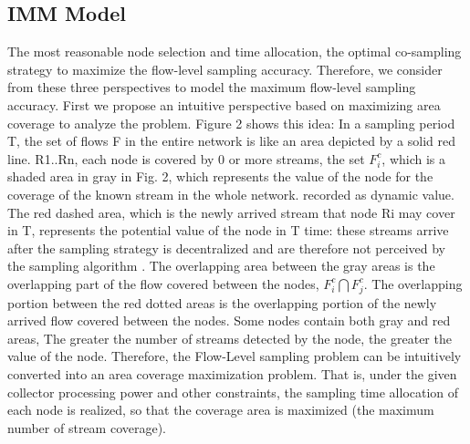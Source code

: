 \documentclass[conference,compsoc]{IEEEtran}
\begin{document}
\subsection{IMM  Model}





The most reasonable node selection and time allocation, the optimal co-sampling strategy to maximize the flow-level sampling accuracy. Therefore, we consider from these three perspectives to model the maximum flow-level sampling accuracy. First we propose an intuitive perspective based on maximizing area coverage to analyze the problem. Figure 2 shows this idea: In a sampling period T, the set of flows F in the entire network is like an area depicted by a solid red line. R1..Rn, each node is covered by 0 or more streams, the set $F_i^c$, which is a shaded area in gray in Fig. 2, which represents the value of the node for the coverage of the known stream in the whole network. recorded as dynamic value. The red dashed area, which is the newly arrived stream that node Ri may cover in T, represents the potential value of the node in T time: these streams arrive after the sampling strategy is decentralized and are therefore not perceived by the sampling algorithm . The overlapping area between the gray areas is the overlapping part of the flow covered between the nodes, $F_i^c \bigcap F_j^c$. The overlapping portion between the red dotted areas is the overlapping portion of the newly arrived flow covered between the nodes. Some nodes contain both gray and red areas, The greater the number of streams detected by the node, the greater the value of the node. Therefore, the Flow-Level sampling problem can be intuitively converted into an area coverage maximization problem. That is, under the given collector processing power and other constraints, the sampling time allocation of each node is realized, so that the coverage area is maximized (the maximum number of stream coverage).
\end{document}
